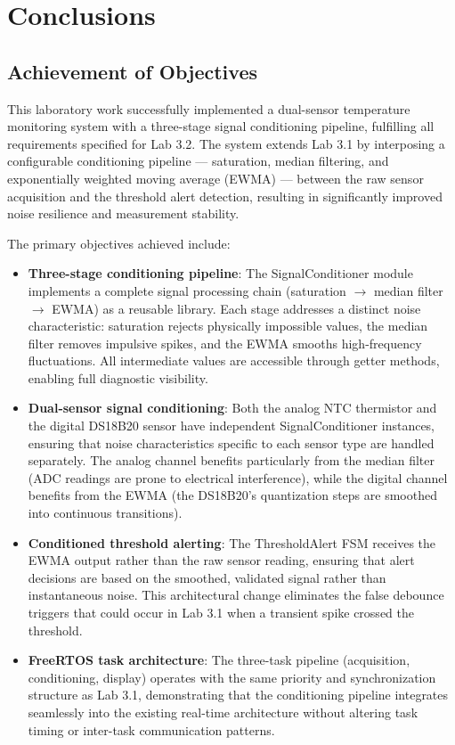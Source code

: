 \section{Conclusions}

\subsection{Achievement of Objectives}

This laboratory work successfully implemented a dual-sensor temperature monitoring system with a three-stage signal conditioning pipeline, fulfilling all requirements specified for Lab 3.2. The system extends Lab 3.1 by interposing a configurable conditioning pipeline --- saturation, median filtering, and exponentially weighted moving average (EWMA) --- between the raw sensor acquisition and the threshold alert detection, resulting in significantly improved noise resilience and measurement stability.

The primary objectives achieved include:
\begin{itemize}
    \item \textbf{Three-stage conditioning pipeline}: The SignalConditioner module implements a complete signal processing chain (saturation $\rightarrow$ median filter $\rightarrow$ EWMA) as a reusable library. Each stage addresses a distinct noise characteristic: saturation rejects physically impossible values, the median filter removes impulsive spikes, and the EWMA smooths high-frequency fluctuations. All intermediate values are accessible through getter methods, enabling full diagnostic visibility.
    \item \textbf{Dual-sensor signal conditioning}: Both the analog NTC thermistor and the digital DS18B20 sensor have independent SignalConditioner instances, ensuring that noise characteristics specific to each sensor type are handled separately. The analog channel benefits particularly from the median filter (ADC readings are prone to electrical interference), while the digital channel benefits from the EWMA (the DS18B20's quantization steps are smoothed into continuous transitions).
    \item \textbf{Conditioned threshold alerting}: The ThresholdAlert FSM receives the EWMA output rather than the raw sensor reading, ensuring that alert decisions are based on the smoothed, validated signal rather than instantaneous noise. This architectural change eliminates the false debounce triggers that could occur in Lab 3.1 when a transient spike crossed the threshold.
    \item \textbf{FreeRTOS task architecture}: The three-task pipeline (acquisition, conditioning, display) operates with the same priority and synchronization structure as Lab 3.1, demonstrating that the conditioning pipeline integrates seamlessly into the existing real-time architecture without altering task timing or inter-task communication patterns.
\end{itemize}

